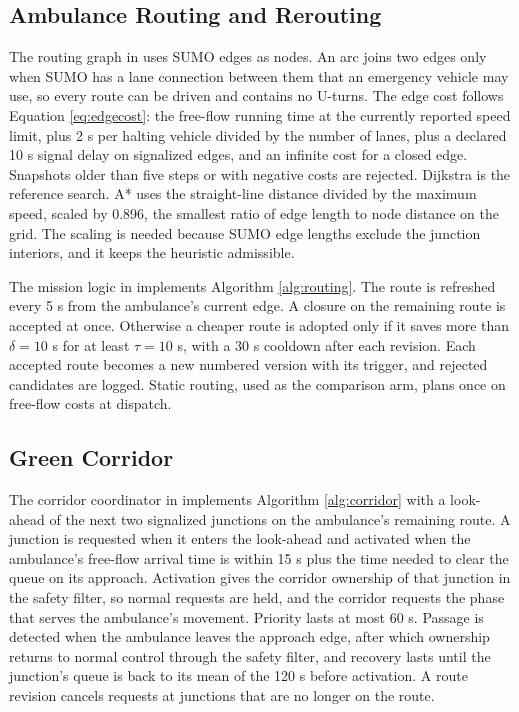 \subsection{Ambulance Routing and Rerouting}

The routing graph in  uses SUMO edges as nodes. An arc joins two edges only when SUMO has a lane connection between them that an emergency vehicle may use, so every route can be driven and contains no U-turns. The edge cost follows Equation \ref{eq:edgecost}: the free-flow running time at the currently reported speed limit, plus 2 s per halting vehicle divided by the number of lanes, plus a declared 10 s signal delay on signalized edges, and an infinite cost for a closed edge. Snapshots older than five steps or with negative costs are rejected. Dijkstra is the reference search. A* uses the straight-line distance divided by the maximum speed, scaled by 0.896, the smallest ratio of edge length to node distance on the grid. The scaling is needed because SUMO edge lengths exclude the junction interiors, and it keeps the heuristic admissible.

The mission logic in  implements Algorithm \ref{alg:routing}. The route is refreshed every 5 s from the ambulance's current edge. A closure on the remaining route is accepted at once. Otherwise a cheaper route is adopted only if it saves more than $\delta=10$ s for at least $\tau=10$ s, with a 30 s cooldown after each revision. Each accepted route becomes a new numbered version with its trigger, and rejected candidates are logged. Static routing, used as the comparison arm, plans once on free-flow costs at dispatch.

\subsection{Green Corridor}

The corridor coordinator in  implements Algorithm \ref{alg:corridor} with a look-ahead of the next two signalized junctions on the ambulance's remaining route. A junction is requested when it enters the look-ahead and activated when the ambulance's free-flow arrival time is within 15 s plus the time needed to clear the queue on its approach. Activation gives the corridor ownership of that junction in the safety filter, so normal requests are held, and the corridor requests the phase that serves the ambulance's movement. Priority lasts at most 60 s. Passage is detected when the ambulance leaves the approach edge, after which ownership returns to normal control through the safety filter, and recovery lasts until the junction's queue is back to its mean of the 120 s before activation. A route revision cancels requests at junctions that are no longer on the route.

